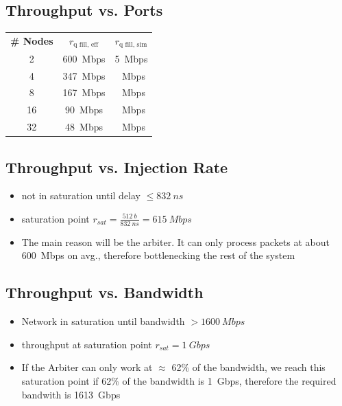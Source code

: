 \documentclass[]{scrartcl}
\begin{document}
    \subsection{Throughput vs. Ports}
        \begin{table}[H]
            \centering
            \begin{tabular}{ccc}
            \textbf{\# Nodes} & \textbf{$r_\text{q fill, eff}$} & \textbf{$r_\text{q fill, sim}$}\\
            2 & \SI{600}{Mbps} & \SI{5}{Mbps}\\
            4 & \SI{347}{Mbps} & \SI{}{Mbps}\\
            8 & \SI{167}{Mbps} & \SI{}{Mbps}\\
            16 & \SI{90}{Mbps} & \SI{}{Mbps}\\
            32 & \SI{48}{Mbps} & \SI{}{Mbps}
            \end{tabular}
        \end{table}


    \subsection{Throughput vs. Injection Rate}
    \begin{itemize}
        \item not in saturation until delay $\leq \SI{832}{ns}$
        \item saturation point $r_{sat} = \frac{\SI{512}{b}}{\SI{832}{ns}} = \SI{615}{Mbps}$
        \item The main reason will be the arbiter. It can only process packets at about \SI{600}{Mbps} on avg., therefore bottlenecking the rest of the system
    \end{itemize}
    \subsection{Throughput vs. Bandwidth}
    \begin{itemize}
        \item Network in saturation until bandwidth $> \SI{1600}{Mbps}$
        \item throughput at saturation point $r_{sat} = \SI{1}{Gbps}$
        \item If the Arbiter can only work at $\approx$ 62\% of the bandwidth, we reach this saturation point if 62\% of the bandwidth is \SI{1}{Gbps}, therefore the required bandwith is \SI{1613}{Gbps}
    \end{itemize}
\end{document}
